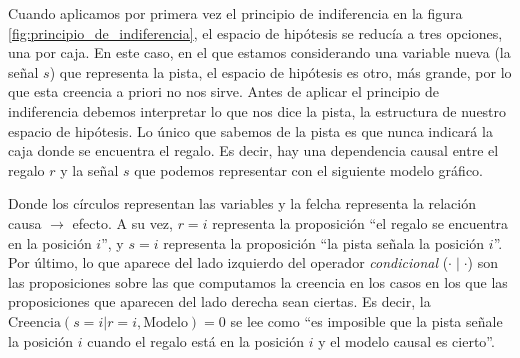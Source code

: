 \documentclass[a4paper,10pt]{book}
\theoremstyle{definition}
\begin{document}
Cuando aplicamos por primera vez el principio de indiferencia en la figura \ref{fig:principio_de_indiferencia}, el espacio de hipótesis se reducía a tres opciones, una por caja.
%
En este caso, en el que estamos considerando una variable nueva (la señal $s$) que representa la pista, el espacio de hipótesis es otro, más grande, por lo que esta creencia a priori no nos sirve.
%
Antes de aplicar el principio de indiferencia debemos interpretar lo que nos dice la pista, la estructura de nuestro espacio de hipótesis.
%
Lo único que sabemos de la pista es que nunca indicará la caja donde se encuentra el regalo.
%
Es decir, hay una dependencia causal entre el regalo $r$ y la señal $s$ que podemos representar con el siguiente modelo gráfico.
%
\begin{figure}[H]
\centering
{}
\end{figure}
%
Donde los círculos representan las variables y la felcha representa la relación causa $\rightarrow$ efecto.
%
A su vez, $r=i$ representa la proposición ``el regalo se encuentra en la posición $i$'', y $s=i$ representa la proposición ``la pista señala la posición $i$''.
%
Por último, lo que aparece del lado izquierdo del operador \emph{condicional} ($\cdot \mid \cdot$) son las proposiciones sobre las que computamos la creencia en los casos en los que las proposiciones que aparecen del lado derecha sean ciertas.
%
Es decir, la $\text{Creencia}(s=i|r=i,\text{Modelo}) = 0$ se lee como ``es imposible que la pista señale la posición $i$ cuando el regalo está en la posición $i$ y el modelo causal es cierto''. 

\end{document}
